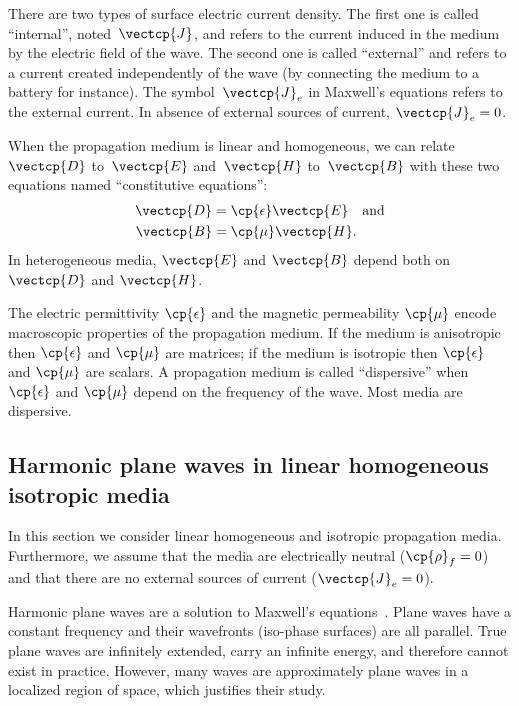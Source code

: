 \begin{refsection}
There are two types of surface electric current density.
The first one is called ``internal'', noted~$\vectcp{J}$, and refers to the current induced in the medium by the electric field of the wave.
The second one is called ``external'' and refers to a current created independently of the wave (by connecting the medium to a battery for instance).
The symbol~$\vectcp{J}_e$ in Maxwell's equations refers to the external current.
In absence of external sources of current, $\vectcp{J}_e=0$.

When the propagation medium is linear and homogeneous,
we can relate $\vectcp{D}$ to~$\vectcp{E}$
and~$\vectcp{H}$ to~$\vectcp{B}$
with these two equations named ``constitutive equations'':
\begin{subequations}
    \label{eq:complex_constitutive}
    \begin{align}
        \vectcp{D} &= \cp{\epsilon} \vectcp{E} \text{\quad and}
        \label{eq:complex_constitutive_electric}
        \\
        \vectcp{B} &= \cp{\mu}      \vectcp{H}
        \label{eq:complex_constitutive_magnetic}
        \text{.}
    \end{align}
\end{subequations}
In heterogeneous media, $\vectcp{E}$ and $\vectcp{B}$ depend both on $\vectcp{D}$ and $\vectcp{H}$.

The electric permittivity $\cp{\epsilon}$ and
the magnetic permeability $\cp{\mu}$
encode macroscopic properties of the propagation medium.
If the medium is anisotropic then $\cp{\epsilon}$ and $\cp{\mu}$ are matrices;
if the medium is isotropic   then $\cp{\epsilon}$ and $\cp{\mu}$ are scalars.
A propagation medium is called ``dispersive'' when $\cp{\epsilon}$ and $\cp{\mu}$ depend on the frequency of the wave.
Most media are dispersive.




\subsection{Harmonic plane waves in linear homogeneous isotropic media}

In this section we consider linear homogeneous and isotropic propagation media.
Furthermore, we assume that the media are electrically neutral ($\cp{\rho}_f = 0$) and that there are no external sources of current ($\vectcp{J}_e=0$).

Harmonic plane waves are a solution to Maxwell's equations~\parencite{stratton1941electromagnetic}.
Plane waves have a constant frequency and their wavefronts (iso-phase surfaces) are all parallel.
True plane waves are infinitely extended, carry an infinite energy, and therefore cannot exist in practice.
However, many waves are approximately plane waves in a localized region of space,
which justifies their study.


\end{refsection}
